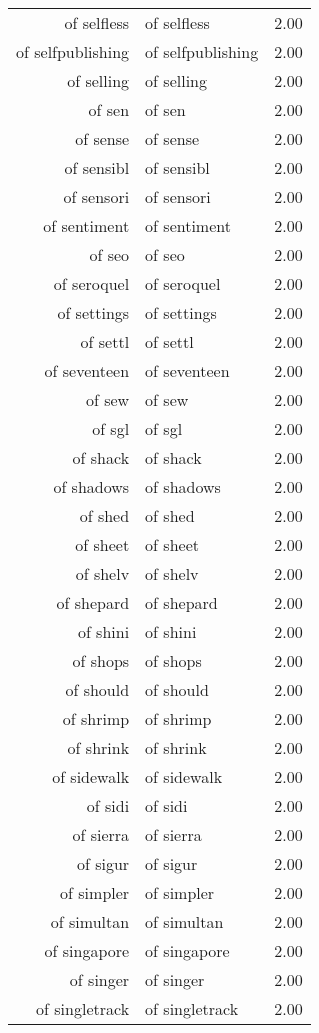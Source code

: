\begin{table}[ht]
\begin{tabular}{rlr}
  of selfless & of selfless & 2.00 \\ 
  of selfpublishing & of selfpublishing & 2.00 \\ 
  of selling & of selling & 2.00 \\ 
  of sen & of sen & 2.00 \\ 
  of sense & of sense & 2.00 \\ 
  of sensibl & of sensibl & 2.00 \\ 
  of sensori & of sensori & 2.00 \\ 
  of sentiment & of sentiment & 2.00 \\ 
  of seo & of seo & 2.00 \\ 
  of seroquel & of seroquel & 2.00 \\ 
  of settings & of settings & 2.00 \\ 
  of settl & of settl & 2.00 \\ 
  of seventeen & of seventeen & 2.00 \\ 
  of sew & of sew & 2.00 \\ 
  of sgl & of sgl & 2.00 \\ 
  of shack & of shack & 2.00 \\ 
  of shadows & of shadows & 2.00 \\ 
  of shed & of shed & 2.00 \\ 
  of sheet & of sheet & 2.00 \\ 
  of shelv & of shelv & 2.00 \\ 
  of shepard & of shepard & 2.00 \\ 
  of shini & of shini & 2.00 \\ 
  of shops & of shops & 2.00 \\ 
  of should & of should & 2.00 \\ 
  of shrimp & of shrimp & 2.00 \\ 
  of shrink & of shrink & 2.00 \\ 
  of sidewalk & of sidewalk & 2.00 \\ 
  of sidi & of sidi & 2.00 \\ 
  of sierra & of sierra & 2.00 \\ 
  of sigur & of sigur & 2.00 \\ 
  of simpler & of simpler & 2.00 \\ 
  of simultan & of simultan & 2.00 \\ 
  of singapore & of singapore & 2.00 \\ 
  of singer & of singer & 2.00 \\ 
  of singletrack & of singletrack & 2.00 \\ 

\end{tabular}
\end{table}
